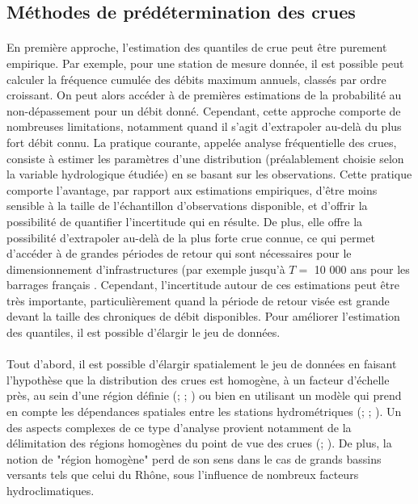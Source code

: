 	\subsection{Méthodes de prédétermination des crues}
	
\label{subsec:méthodes}	
	\paragraph{} En première approche, l'estimation des quantiles de crue peut être purement empirique. Par exemple, pour une station de mesure donnée, il est possible peut calculer la fréquence cumulée des débits maximum annuels, classés par ordre croissant. On peut alors accéder à de premières estimations de la probabilité au non-dépassement pour un débit donné. Cependant, cette approche comporte de nombreuses limitations, notamment quand il s'agit d'extrapoler au-delà du plus fort débit connu. La pratique courante, appelée analyse fréquentielle des crues, consiste à estimer les paramètres d'une distribution (préalablement choisie selon la variable hydrologique étudiée) en se basant sur les observations. Cette pratique comporte l'avantage, par rapport aux estimations empiriques, d'être moins sensible à la taille de l'échantillon d'observations disponible, et d'offrir la possibilité de quantifier l'incertitude qui en résulte. De plus, elle offre la possibilité d'extrapoler au-delà de la plus forte crue connue, ce qui permet d'accéder à de grandes périodes de retour qui sont nécessaires pour le dimensionnement d'infrastructures (par exemple jusqu'à $T =$ 10 000 ans pour les barrages français \citep{le_delliou_recommandations_2014}. Cependant, l'incertitude autour de ces estimations peut être très importante, particulièrement quand la période de retour visée est grande devant la taille des chroniques de débit disponibles. Pour améliorer l'estimation des quantiles, il est possible d'élargir le jeu de données. 
	
	\paragraph{} Tout d'abord, il est possible d'élargir spatialement le jeu de données en faisant l'hypothèse que la distribution des crues est homogène, à un facteur d'échelle près, au sein d'une région définie (\cite{hosking_regional_1997}; \cite{gaume_bayesian_2010}; \cite{viglione_flood_2013}) ou bien en utilisant un modèle qui prend en compte les dépendances spatiales entre les stations hydrométriques (\cite{kjeldsen_exploratory_2009}; \cite{renard_bayesian_2011}; \cite{sun_general_2014}). Un des aspects complexes de ce type d'analyse provient notamment de la délimitation des régions homogènes du point de vue des crues (\cite{ouarda_regional_2001}; \cite{han_network_2020}). De plus, la notion de "région homogène" perd de son sens dans le cas de grands bassins versants tels que celui du Rhône, sous l'influence de nombreux facteurs hydroclimatiques.  
	
